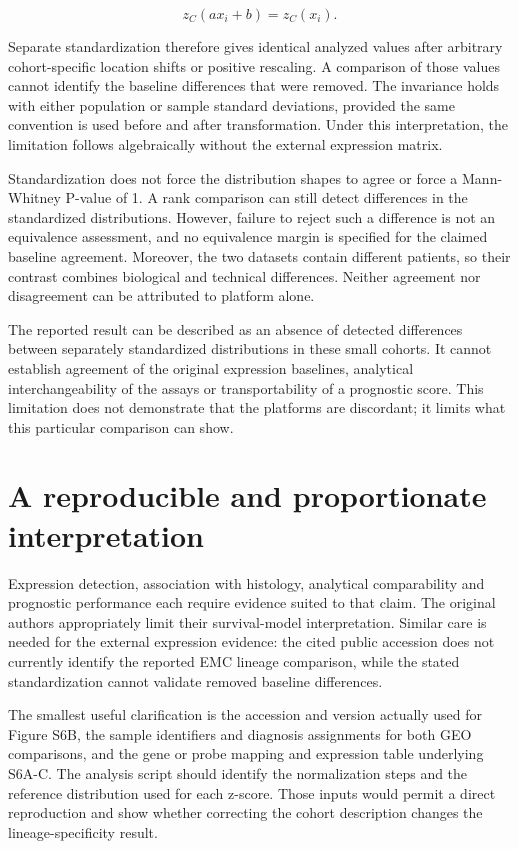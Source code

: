 \documentclass[11pt]{article}
\begin{document}
\[z_C(a x_i+b)=z_C(x_i).\]

Separate standardization therefore gives identical analyzed values after arbitrary cohort-specific location shifts or positive rescaling. A comparison of those values cannot identify the baseline differences that were removed. The invariance holds with either population or sample standard deviations, provided the same convention is used before and after transformation. Under this interpretation, the limitation follows algebraically without the external expression matrix.\par

Standardization does not force the distribution shapes to agree or force a Mann-Whitney P-value of 1. A rank comparison can still detect differences in the standardized distributions. However, failure to reject such a difference is not an equivalence assessment, and no equivalence margin is specified for the claimed baseline agreement. Moreover, the two datasets contain different patients, so their contrast combines biological and technical differences. Neither agreement nor disagreement can be attributed to platform alone.\par

The reported result can be described as an absence of detected differences between separately standardized distributions in these small cohorts. It cannot establish agreement of the original expression baselines, analytical interchangeability of the assays or transportability of a prognostic score. This limitation does not demonstrate that the platforms are discordant; it limits what this particular comparison can show.\par

\section*{A reproducible and proportionate interpretation}

Expression detection, association with histology, analytical comparability and prognostic performance each require evidence suited to that claim. The original authors appropriately limit their survival-model interpretation. Similar care is needed for the external expression evidence: the cited public accession does not currently identify the reported EMC lineage comparison, while the stated standardization cannot validate removed baseline differences.\par

The smallest useful clarification is the accession and version actually used for Figure S6B, the sample identifiers and diagnosis assignments for both GEO comparisons, and the gene or probe mapping and expression table underlying S6A-C. The analysis script should identify the normalization steps and the reference distribution used for each z-score. Those inputs would permit a direct reproduction and show whether correcting the cohort description changes the lineage-specificity result.\par
\end{document}

